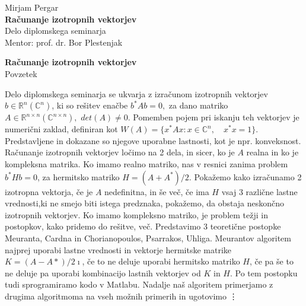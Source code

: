 \documentclass[12pt,a4paper]{amsart}
\theoremstyle{definition}
\theoremstyle{plain}
\newcommand{\R}{\mathbb R}
\newcommand{\C}{\mathbb C}
\begin{document}
\thispagestyle{empty}
\vfill

\begin{center}{\large
Mirjam Pergar\\[2mm]
{\bf Računanje izotropnih vektorjev}\\[10mm]
Delo diplomskega seminarja\\[1cm]
Mentor: prof. dr. Bor Plestenjak}
\end{center}
\vfill

\pagebreak

\thispagestyle{empty}
\tableofcontents
\pagebreak

\thispagestyle{empty}
\begin{center}
{\bf Računanje izotropnih vektorjev}\\[3mm]
{\sc Povzetek}
\end{center}
Delo diplomskega seminarja se ukvarja z izračunom izotropnih vektorjev $b\in\R^{n} (\C^{n})$, ki so rešitev enačbe $b^\ast Ab=0,$ za dano matriko $A\in\R^{n\times n} (\C^{n\times n}),$ $det(A)\ne 0$.
Pomemben pojem pri iskanju teh vektorjev je numerični zaklad, definiran kot $W(A)=\{x^\ast Ax: x \in \C^n,\quad x^\ast x=1\}.$ Predstavljene in dokazane so njegove uporabne lastnosti, kot je npr. konveksnost.
Računanje izotropnih vektorjev ločimo na 2 dela, in sicer, ko je $A$ realna in ko je kompleksna matrika.
Ko imamo realno matriko, nas v resnici zanima problem $b^\ast Hb=0$, za hermitsko matriko $H=(A+A^\ast)/2$. 
Pokažemo kako izračunamo 2 izotropna vektorja, če je $A$ nedefinitna, in še več, če ima $H$ vsaj 3 različne lastne vrednosti,ki ne smejo biti istega predznaka, pokažemo, da obstaja neskončno izotropnih vektorjev.
Ko imamo kompleksno matriko, je problem težji in postopkov, kako pridemo do rešitve, več. Predstavimo 3 teoretične postopke Meuranta, Cardna in Chorianopoulos, Psarrakos, Uhliga.
Meurantov algoritem najprej uporabi lastne vrednosti in vektorje hermitske matrike $K=(A-A\ast)/2\imath$, če to ne deluje uporabi hermitsko matriko $H$, če pa še to ne deluje pa uporabi kombinacijo lastnih vektorjev od $K$ in $H$.
Po tem postopku tudi sprogramiramo kodo v Matlabu.
Nadalje naš algoritem primerjamo z drugima algoritmoma na vseh možnih primerih in ugotovimo \vdots
\end{document}
